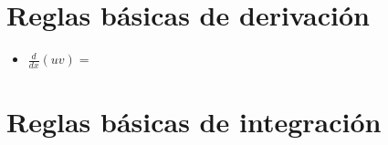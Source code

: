 \documentclass[twoside,letterpaper,twocolumn,12pt]{book}
\begin{document}
\pagestyle{empty} %

\section*{Reglas básicas de derivación}

\begin{itemize}
    \item $\frac{d}{dx}(uv)=  $
\end{itemize}

\newpage
\section*{Reglas básicas de integración}
\end{document}
